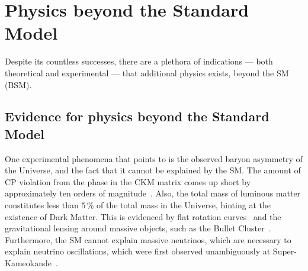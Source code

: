 \section{Physics beyond the Standard Model}

Despite its countless successes, there are a plethora of indications --- both
theoretical and experimental --- that additional physics exists, beyond the SM (BSM).

\subsection{Evidence for physics beyond the Standard Model}
One experimental phenomena that points to \np is the observed baryon asymmetry of the Universe, and
the fact that it cannot be explained by the SM.
The amount of CP violation from the phase in the CKM matrix comes up short by approximately ten
orders of magnitude~\cite{Cline:2006ts,Huet:1994jb}.
Also, the total mass of luminous matter constitutes less than $5\,\%$ of the
total mass in the Universe, hinting at the existence of Dark Matter.
This is evidenced by flat rotation
curves~\cite{1970ApJ...159..379R,1980ApJ...238..471R} and the gravitational lensing around massive
objects, such as the Bullet Cluster~\cite{Markevitch:2003at}.
Furthermore, the SM cannot explain massive neutrinos, which are necessary to explain neutrino
oscillations, which were first observed unambiguously at
Super-Kameokande~\cite{PhysRevLett.81.1562}.



